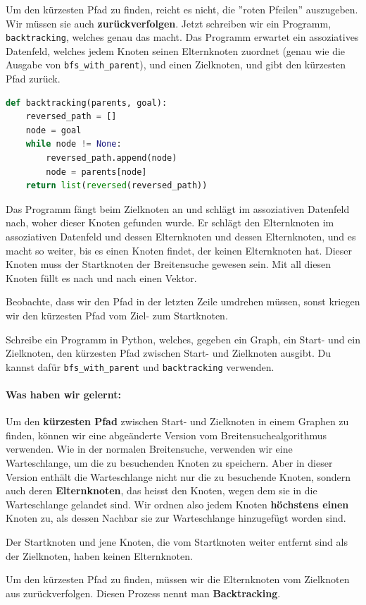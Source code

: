 Um den kürzesten Pfad zu finden, reicht es nicht, die ''roten Pfeilen'' auszugeben. Wir müssen sie auch \textbf{zurückverfolgen}.
Jetzt schreiben wir ein Programm, \texttt{backtracking}, welches genau das macht. Das Programm erwartet ein assoziatives Datenfeld, welches jedem Knoten seinen Elternknoten zuordnet (genau wie die Ausgabe von \texttt{bfs\_with\_parent}), und einen Zielknoten, und gibt den kürzesten Pfad zurück.

\begin{lstlisting}[language=Python, caption={Programm, welches ''rote Pfeile'' zurückverfolgt}, label={backtracking}]
def backtracking(parents, goal):
    reversed_path = []
    node = goal
    while node != None:
        reversed_path.append(node)
        node = parents[node]
    return list(reversed(reversed_path))
\end{lstlisting}
Das Programm fängt beim Zielknoten an und schlägt im assoziativen Datenfeld nach, woher dieser Knoten gefunden wurde. Er schlägt den Elternknoten im assoziativen Datenfeld und dessen Elternknoten und dessen Elternknoten, und es macht so weiter, bis es einen Knoten findet, der keinen Elternknoten hat. Dieser Knoten muss der Startknoten der Breitensuche gewesen sein. Mit all diesen Knoten füllt es nach und nach einen Vektor.

Beobachte, dass wir den Pfad in der letzten Zeile umdrehen müssen, sonst kriegen wir den kürzesten Pfad vom Ziel- zum Startknoten.

\begin{aufgabe}\label{aufgabe_shortest_path}
Schreibe ein Programm in Python, welches, gegeben ein Graph, ein Start- und ein Zielknoten, den kürzesten Pfad zwischen Start- und Zielknoten ausgibt. Du kannst dafür \texttt{bfs\_with\_parent} und \texttt{backtracking} verwenden.
\end{aufgabe}

\begin{framed}
\paragraph{\textcolor{blue-violet}{Was haben wir gelernt:}}
Um den \textbf{kürzesten Pfad} zwischen Start- und Zielknoten in einem Graphen zu finden, können wir eine abgeänderte Version vom Breitensuchealgorithmus verwenden. Wie in der normalen Breitensuche, verwenden wir eine Warteschlange, um die zu besuchenden Knoten zu speichern. Aber in dieser Version enthält die Warteschlange nicht nur die zu besuchende Knoten, sondern auch deren \textbf{Elternknoten}, das heisst den Knoten, wegen dem sie in die Warteschlange gelandet sind. Wir ordnen also jedem Knoten \textbf{höchstens einen} Knoten zu, als dessen Nachbar sie zur Warteschlange hinzugefügt worden sind.

Der Startknoten und jene Knoten, die vom Startknoten weiter entfernt sind als der Zielknoten, haben keinen Elternknoten.

Um den kürzesten Pfad zu finden, müssen wir die Elternknoten vom Zielknoten aus zurückverfolgen. Diesen Prozess nennt man \textbf{Backtracking}.
\end{framed}

